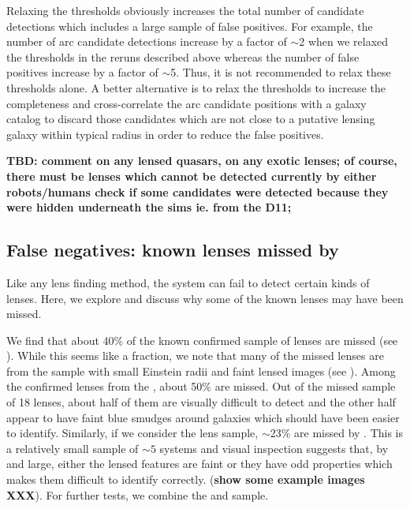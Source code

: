 \documentclass[useAMS,usenatbib,a4paper]{mn2e}
\begin{document}
Relaxing the thresholds obviously increases the total number of
candidate detections which includes a large sample of false positives.
For example, the number of arc candidate detections increase by a factor
of $\sim$2 when we relaxed the thresholds in the reruns described above
whereas the number of false positives increase by a factor of $\sim$5.
Thus, it is not recommended to relax these thresholds alone. A better
alternative is to relax the thresholds to increase the completeness and
cross-correlate the arc candidate positions with a galaxy catalog to
discard those candidates which are not close to a putative lensing
galaxy within typical radius in order to reduce the false positives.


{\bf TBD: 
comment on any lensed quasars, on any exotic lenses;
of course, there must be lenses which cannot be detected currently by
either robots/humans
check if some candidates were detected because they were hidden
underneath the sims ie. from the D11;
}


\subsection{False negatives: known lenses missed by \sw}
\label{sec:fn}
Like any lens finding method, the \sw system can fail to detect certain
kinds of lenses. Here, we explore and discuss why some of the known
lenses may have been missed. 

We find that about 40\% of the known confirmed sample of lenses are
missed (see ). While this seems like a fraction, we note
that many of the missed lenses are from the \rf sample with small
Einstein radii and faint lensed images (see ). Among
the confirmed lenses from the \rf, about 50\% are missed. Out of the
missed sample of 18 lenses, about half of them are visually difficult to
detect and the other half appear to have faint blue smudges around
galaxies which should have been easier to identify. Similarly,
if we consider the \af lens sample, $\sim$23\% are missed by \sw. This
is a relatively small sample of $\sim 5$ systems and visual inspection
suggests that, by and large, either the lensed features are faint
or they have odd properties which makes them difficult to identify
correctly.  ({\bf show some
example images XXX}). For further tests, we combine the \rf and \af sample.
\end{document}
